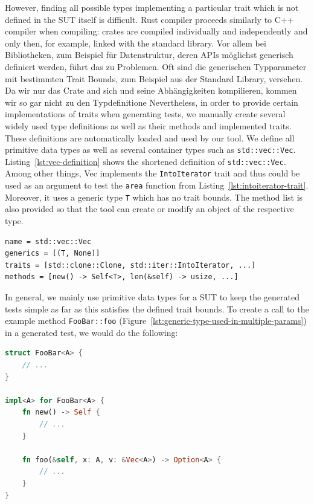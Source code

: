 \documentclass{article}
\begin{document}
However, finding all possible types implementing a particular trait which is not defined in the \ac{SUT} itself is difficult. Rust compiler proceeds similarly to C++ compiler when compiling: crates are compiled individually and independently and only then, for example, linked with the standard library. Vor allem bei Bibliotheken, zum Beispiel für Datenstruktur, deren \acp{API} möglichst generisch definiert werden, führt das zu Problemen. Oft sind die generischen Typparameter mit bestimmten Trait Bounds, zum Beispiel aus der Standard Library, versehen. Da wir nur das Crate and sich und seine Abhängigkeiten kompilieren, kommen wir so gar nicht zu den Typdefinitione Nevertheless, in order to provide certain implementations of traits when generating tests, we manually create several widely used type definitions as well as their methods and implemented traits. These definitions are automatically loaded and used by our tool. We define all primitive data types as well as several container types such as \lstinline{std::vec::Vec}. Listing~\ref{lst:vec-definition} shows the shortened definition of \lstinline{std::vec::Vec}. Among other things, Vec implements the \lstinline{IntoIterator} trait and thus could be used as an argument to test the \lstinline{area} function from Listing~\ref{lst:intoiterator-trait}. Moreover, it uses a generic type \lstinline{T} which has no trait bounds. The method list is also provided so that the tool can create or modify an object of the respective type.

\begin{lstlisting}[language={}, style=boxed, caption={std::vec::Vec type definition}, label=lst:vec-definition]
name = std::vec::Vec
generics = [(T, None)]
traits = [std::clone::Clone, std::iter::IntoIterator, ...]
methods = [new() -> Self<T>, len(&self) -> usize, ...]
\end{lstlisting}

In general, we mainly use primitive data types for a \ac{SUT} to keep the generated tests simple as far as this satisfies the defined trait bounds. To create a call to the example method \lstinline{FooBar::foo} (Figure~\ref{lst:generic-type-used-in-multiple-params}) in a generated test, we would do the following:

\begin{lstlisting}[language=Rust, style=boxed, caption={A generic type A is used in multiple parameters and return value}, label=lst:generic-type-used-in-multiple-params]
struct FooBar<A> {
    // ...
}

impl<A> for FooBar<A> {
    fn new() -> Self {
        // ...
    }

    fn foo(&self, x: A, v: &Vec<A>) -> Option<A> {
        // ...
    }
}
\end{lstlisting}
\end{document}
